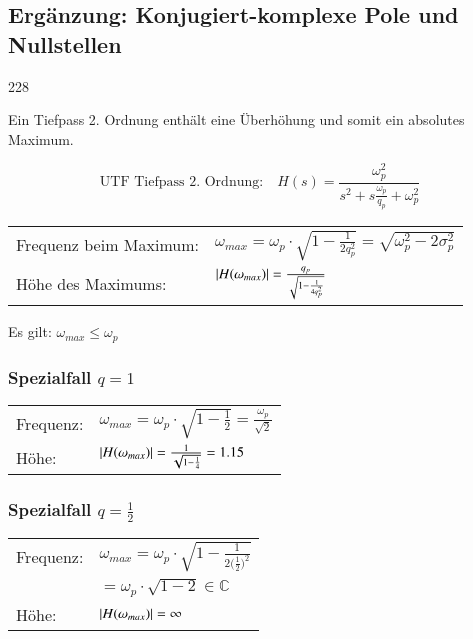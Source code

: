 \subsection{Ergänzung: Konjugiert-komplexe Pole und Nullstellen}{228}

Ein Tiefpass 2. Ordnung enthält eine Überhöhung und somit ein absolutes Maximum. 

$$ \text{UTF Tiefpass 2. Ordnung:} \quad H(s) = \frac{\omega_p^2}{s^2 + s \frac{\omega_p}{q_p} + \omega_p^2} $$

\renewcommand{\arraystretch}{2}
\begin{tabular}{ll}
    Frequenz beim Maximum:  & $ \omega_{max} = \omega_p \cdot \sqrt{1 - \frac{1}{2 q_p^2}} = \sqrt{\omega_p^2 - 2 \sigma_p^2}$ \\
    Höhe des Maximums:      & $ \left|H(\omega_{max})\right| = \frac{q_p}{\sqrt{1 - \frac{1}{4 q_p^2}}}$ \\
\end{tabular}

\textrightarrow Es gilt: $\omega_{max} \leq \omega_p$


\subsubsection{Spezialfall $q = 1$}

\renewcommand{\arraystretch}{1.5}
\begin{minipage}[c]{0.55\columnwidth}    
    \begin{tabular}{ll}
        Frequenz:  & $ \omega_{max} = \omega_p \cdot \sqrt{1 - \frac{1}{2}} = \frac{\omega_p}{\sqrt{2}}$ \\
        Höhe:      & $ \left|H(\omega_{max})\right| = \frac{1}{\sqrt{1 - \frac{1}{4}}} = 1.15$ \\
    \end{tabular}

\end{minipage}
\hfill
\begin{minipage}[c]{0.43\columnwidth}
    
\end{minipage}


\subsubsection{Spezialfall $q = \frac{1}{2}$}

\begin{minipage}[c]{0.55\columnwidth}
    \begin{tabular}{ll}
            Frequenz:  & $ \omega_{max} = \omega_p \cdot \sqrt{1 - \frac{1}{2 \big(\frac{1}{2} \big)^2 }}$ \\
                       & $ = \omega_p \cdot \sqrt{1-2} \in \mathbb{C}$ \\
            Höhe:      & $ \left|H(\omega_{max})\right| = \infty$ \\   %
    \end{tabular}
\end{minipage}
\hfill
\begin{minipage}[c]{0.43\columnwidth}
    
\end{minipage}


